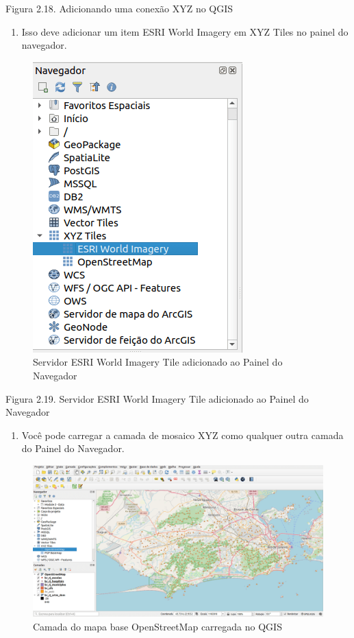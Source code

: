 \documentclass[
]{krantz}
\providecommand{\tightlist}{%
  \setlength{\itemsep}{0pt}\setlength{\parskip}{0pt}}
\begin{document}
Figura 2.18. Adicionando uma conexão XYZ no QGIS

\begin{enumerate}
\def\labelenumi{\arabic{enumi}.}
\setcounter{enumi}{4}
\tightlist
\item
  Isso deve adicionar um item ESRI World Imagery em XYZ Tiles no painel do navegador.
\end{enumerate}

\begin{figure}
\centering
\includegraphics{media/modulo2/xyz-2.png}
\caption{Servidor ESRI World Imagery Tile adicionado ao Painel do Navegador}
\end{figure}

Figura 2.19. Servidor ESRI World Imagery Tile adicionado ao Painel do Navegador

\begin{enumerate}
\def\labelenumi{\arabic{enumi}.}
\setcounter{enumi}{5}
\tightlist
\item
  Você pode carregar a camada de mosaico XYZ como qualquer outra camada do Painel do Navegador.
\end{enumerate}

\begin{figure}
\centering
\includegraphics{media/modulo2/xyz-3.png}
\caption{Camada do mapa base OpenStreetMap carregada no QGIS}
\end{figure}
\end{document}
